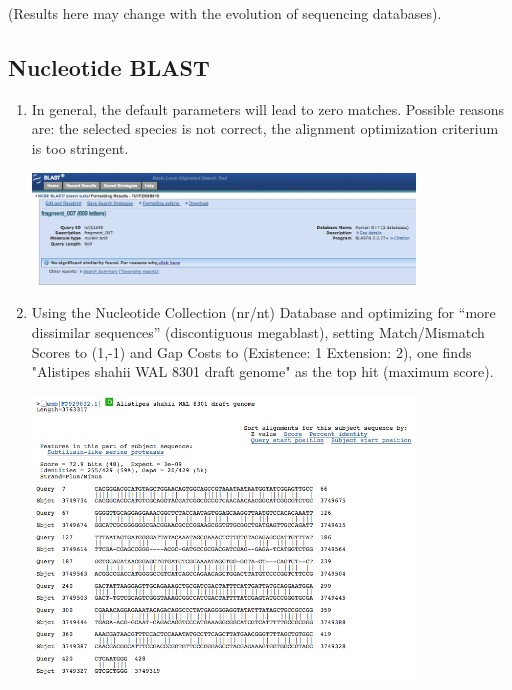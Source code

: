 \documentclass[a4paper,11pt]{article}
\begin{document}
(Results here may change with the evolution of sequencing databases).

\subsection{Nucleotide BLAST}

\begin{enumerate}
\item In general, the default parameters will lead to zero matches. Possible reasons are: the selected species is not correct, the alignment optimization criterium is too stringent.

\vspace{0.5cm}
\begin{center}
\includegraphics[width=0.8\textwidth]{blastn1.png}
\end{center}
\vspace{0.5cm}

\item Using the Nucleotide Collection (nr/nt) Database and optimizing for ``more dissimilar sequences''
(discontiguous megablast), setting Match/Mismatch Scores to (1,-1) and Gap Costs to (Existence: 1 Extension: 2), one finds "Alistipes shahii WAL 8301 draft genome" as the top hit (maximum score).

\vspace{0.5cm}
\begin{center}
\includegraphics[width=0.8\textwidth]{blastn2.png}
\end{center}
\vspace{0.5cm}


\end{enumerate}
\end{document}
